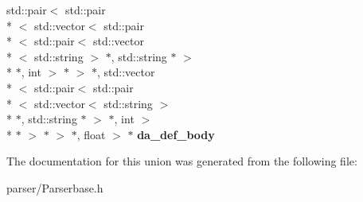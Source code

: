 \begin{DoxyCompactItemize}
\item 
\hypertarget{unionParserBase_1_1STYPE_____a3db853e7495c942705760c89cdeaa79e}{std\+::pair$<$ std\+::pair\\*
$<$ std\+::vector$<$ std\+::pair\\*
$<$ std\+::pair$<$ std\+::vector\\*
$<$ std\+::string $>$ $\ast$, std\+::string $\ast$ $>$\\*
 $\ast$, int $>$ $\ast$ $>$ $\ast$, std\+::vector\\*
$<$ std\+::pair$<$ std\+::pair\\*
$<$ std\+::vector$<$ std\+::string $>$\\*
 $\ast$, std\+::string $\ast$ $>$ $\ast$, int $>$\\*
 $\ast$ $>$ $\ast$ $>$ $\ast$, float $>$ $\ast$ {\bfseries da\+\_\+def\+\_\+body}}\label{unionParserBase_1_1STYPE_____a3db853e7495c942705760c89cdeaa79e}

\end{DoxyCompactItemize}


The documentation for this union was generated from the following file\+:\begin{DoxyCompactItemize}
\item 
parser/Parserbase.\+h\end{DoxyCompactItemize}
